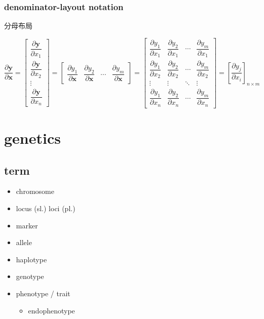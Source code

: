 \documentclass[
]{book}
\providecommand{\tightlist}{%
  \setlength{\itemsep}{0pt}\setlength{\parskip}{0pt}}
\theoremstyle{definition}
\theoremstyle{definition}
\theoremstyle{definition}
\theoremstyle{definition}
\theoremstyle{remark}
\begin{document}
\subsection{denominator-layout notation}\label{denominator-layout-notation}

\begin{CJK}{UTF8}{bsmi}
分母布局
\end{CJK}

\[
\dfrac{\partial\boldsymbol{y}}{\partial\boldsymbol{x}}=\begin{bmatrix}\dfrac{\partial\boldsymbol{y}}{\partial x_{1}}\\
\dfrac{\partial\boldsymbol{y}}{\partial x_{2}}\\
\vdots\\
\dfrac{\partial\boldsymbol{y}}{\partial x_{n}}
\end{bmatrix}=\begin{bmatrix}\dfrac{\partial y_{1}}{\partial\boldsymbol{x}} & \dfrac{\partial y_{2}}{\partial\boldsymbol{x}} & \cdots & \dfrac{\partial y_{m}}{\partial\boldsymbol{x}}\end{bmatrix}=\begin{bmatrix}\dfrac{\partial y_{1}}{\partial x_{1}} & \dfrac{\partial y_{2}}{\partial x_{1}} & \cdots & \dfrac{\partial y_{m}}{\partial x_{1}}\\
\dfrac{\partial y_{1}}{\partial x_{2}} & \dfrac{\partial y_{2}}{\partial x_{2}} & \cdots & \dfrac{\partial y_{m}}{\partial x_{2}}\\
\vdots & \vdots & \ddots & \vdots\\
\dfrac{\partial y_{1}}{\partial x_{n}} & \dfrac{\partial y_{2}}{\partial x_{n}} & \cdots & \dfrac{\partial y_{m}}{\partial x_{n}}
\end{bmatrix}=\left[\dfrac{\partial y_{j}}{\partial x_{i}}\right]_{n\times m}
\]

\chapter{genetics}\label{genetics}

\section{term}\label{term}

\begin{itemize}
\tightlist
\item
  chromosome
\item
  locus (sl.) loci (pl.)
\item
  marker
\item
  allele
\item
  haplotype
\item
  genotype
\item
  phenotype / trait

  \begin{itemize}
  \tightlist
  \item
    endophenotype
  \end{itemize}
\end{itemize}
\end{document}
